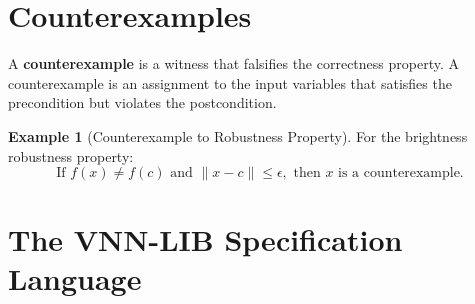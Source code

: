 \documentclass[oneside,11pt,dvipsnames]{book}
\numberwithin{equation}{section}
\theoremstyle{definition}
\newtheorem{example}{Example}[section]
\theoremstyle{remark}
\begin{document}





\section{Counterexamples}
A \textbf{counterexample} is a witness that falsifies the correctness property. A counterexample is an assignment to the input variables that satisfies the precondition but violates the postcondition.

\begin{example}[Counterexample to Robustness Property]
For the brightness robustness property:
\[
\text{If } f(x) \neq f(c) \text{ and } \|x - c\| \leq \epsilon, \text{ then } x \text{ is a counterexample.}
\]
\end{example}


\section{The VNN-LIB  Specification Language}
\end{document}
